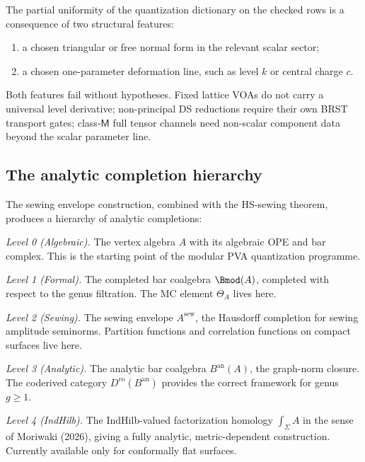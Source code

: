 \begin{remark}
The partial uniformity of the quantization dictionary on the checked
rows is a consequence of two structural features:
\begin{enumerate}[leftmargin=2.4em]
\item a chosen triangular or free normal form in the relevant scalar
sector;
\item a chosen one-parameter deformation line, such as level $k$ or
central charge $c$.
\end{enumerate}
Both features fail without hypotheses.  Fixed lattice VOAs do not carry
a universal level derivative; non-principal DS reductions require their
own BRST transport gates; class-\(\mathsf M\) full tensor channels
need non-scalar component data beyond the scalar parameter line.
\end{remark}

\subsection{The analytic completion hierarchy}

\begin{construction}
The sewing envelope construction, combined with the HS-sewing theorem,
produces a hierarchy of analytic completions:

\smallskip
\noindent
\emph{Level 0 (Algebraic).}
The vertex algebra $A$ with its algebraic OPE and bar complex.
This is the starting point of the modular PVA quantization programme.

\smallskip
\noindent
\emph{Level 1 (Formal).}
The completed bar coalgebra $\Bmod(A)$, completed with respect to
the genus filtration. The MC element $\Theta_A$ lives here.

\smallskip
\noindent
\emph{Level 2 (Sewing).}
The sewing envelope $A^{\mathrm{sew}}$, the Hausdorff completion for
sewing amplitude seminorms. Partition functions and correlation
functions on compact surfaces live here.

\smallskip
\noindent
\emph{Level 3 (Analytic).}
The analytic bar coalgebra $B^{\mathrm{an}}(A)$, the graph-norm
closure. The coderived category $D^{\mathrm{co}}(B^{\mathrm{an}})$
provides the correct framework for genus $g \ge 1$.

\smallskip
\noindent
\emph{Level 4 (IndHilb).}
The IndHilb-valued factorization homology $\int_\Sigma A$ in the
sense of Moriwaki (2026), giving a fully analytic, metric-dependent
construction. Currently available only for conformally flat surfaces.
\end{construction}

